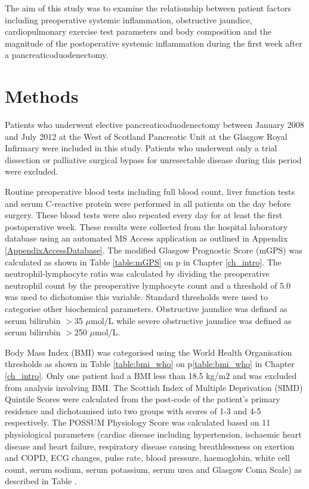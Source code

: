 The aim of this study was to examine the relationship between patient factors including preoperative systemic inflammation, obstructive jaundice, cardiopulmonary exercise test parameters and body composition and the magnitude of the postoperative systemic inflammation during the first week after a pancreaticoduodenectomy. 



\section{Methods}
Patients who underwent elective pancreaticoduodenectomy between January 2008 and July 2012 at the West of Scotland Pancreatic Unit at the Glasgow Royal Infirmary were included in this study. 
Patients who underwent only a trial dissection or palliative surgical bypass for unresectable disease during this period were excluded.

Routine preoperative blood tests including full blood count, liver function tests and serum C-reactive protein were performed in all patients on the day before surgery. 
These blood tests were also repeated every day for at least the first postoperative week. 
These results were collected from the hospital laboratory database using an automated MS Access application as outlined in Appendix \ref{AppendixAccessDatabase}. 
The modified Glasgow Prognostic Score (mGPS) was calculated as shown in Table \ref{table:mGPS} on p\pageref{table:mGPS} in Chapter \ref{ch_intro}. 
The neutrophil-lymphocyte ratio was calculated by dividing the preoperative neutrophil count by the preoperative lymphocyte count and a threshold of 5.0 was used to dichotomise this variable. 
Standard thresholds were used to categorise other biochemical parameters. 
Obstructive jaundice was defined as serum bilirubin $>$35 $\mu$mol/L while severe obstructive jaundice was defined as serum bilirubin $>$250 $\mu$mol/L. 

Body Mass Index (BMI) was categorised using the World Health Organisation thresholds as shown in Table \ref{table:bmi_who} on p\ref{table:bmi_who} in Chapter \ref{ch_intro}. 
Only one patient had a BMI less than 18.5 kg/m$2$ and was excluded from analysis involving BMI.
The Scottish Index of Multiple Deprivation (SIMD) Quintile Scores were calculated from the post-code of the patient's primary residence and dichotomised into two groups with scores of 1-3 and 4-5 respectively.
The POSSUM Physiology Score was calculated based on 11 physiological parameters (cardiac disease including hypertension, ischaemic heart disease and heart failure, respiratory disease causing breathlessness on exertion and COPD, ECG changes, pulse rate, blood pressure, haemoglobin, white cell count, serum sodium, serum potassium, serum urea and Glasgow Coma Scale) as described in Table .


